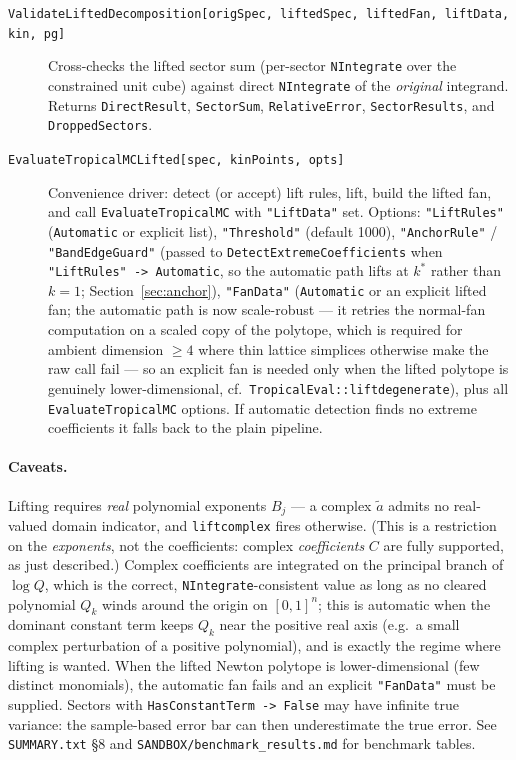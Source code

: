 \documentclass[11pt,a4paper]{article}
\begin{document}
\begin{description}
  \item[\texttt{ValidateLiftedDecomposition[origSpec, liftedSpec, liftedFan, liftData, kin, pg]}] Cross-checks the lifted sector sum (per-sector \texttt{NIntegrate} over the constrained unit cube) against direct \texttt{NIntegrate} of the \emph{original} integrand. Returns \texttt{DirectResult}, \texttt{SectorSum}, \texttt{RelativeError}, \texttt{SectorResults}, and \texttt{DroppedSectors}.
  \item[\texttt{EvaluateTropicalMCLifted[spec, kinPoints, opts]}] Convenience driver: detect (or accept) lift rules, lift, build the lifted fan, and call \texttt{EvaluateTropicalMC} with \texttt{"LiftData"} set. Options: \texttt{"LiftRules"} (\texttt{Automatic} or explicit list), \texttt{"Threshold"} (default 1000), \texttt{"AnchorRule"} / \texttt{"BandEdgeGuard"} (passed to \texttt{DetectExtremeCoefficients} when \texttt{"LiftRules" -> Automatic}, so the automatic path lifts at $k^{*}$ rather than $k=1$; Section~\ref{sec:anchor}), \texttt{"FanData"} (\texttt{Automatic} or an explicit lifted fan; the automatic path is now scale-robust --- it retries the normal-fan computation on a scaled copy of the polytope, which is required for ambient dimension $\ge4$ where thin lattice simplices otherwise make the raw call fail --- so an explicit fan is needed only when the lifted polytope is genuinely lower-dimensional, cf.\ \texttt{TropicalEval::liftdegenerate}), plus all \texttt{EvaluateTropicalMC} options. If automatic detection finds no extreme coefficients it falls back to the plain pipeline.
\end{description}

\paragraph{Caveats.} Lifting requires \emph{real} polynomial exponents $B_j$ --- a complex $\tilde{a}$ admits no real-valued domain indicator, and \texttt{liftcomplex} fires otherwise. (This is a restriction on the \emph{exponents}, not the coefficients: complex \emph{coefficients} $C$ are fully supported, as just described.) Complex coefficients are integrated on the principal branch of $\log Q$, which is the correct, \texttt{NIntegrate}-consistent value as long as no cleared polynomial $Q_k$ winds around the origin on $[0,1]^n$; this is automatic when the dominant constant term keeps $Q_k$ near the positive real axis (e.g.\ a small complex perturbation of a positive polynomial), and is exactly the regime where lifting is wanted. When the lifted Newton polytope is lower-dimensional (few distinct monomials), the automatic fan fails and an explicit \texttt{"FanData"} must be supplied. Sectors with \texttt{HasConstantTerm -> False} may have infinite true variance: the sample-based error bar can then underestimate the true error. See \texttt{SUMMARY.txt} \S8 and \texttt{SANDBOX/benchmark\_results.md} for benchmark tables.
\end{document}
